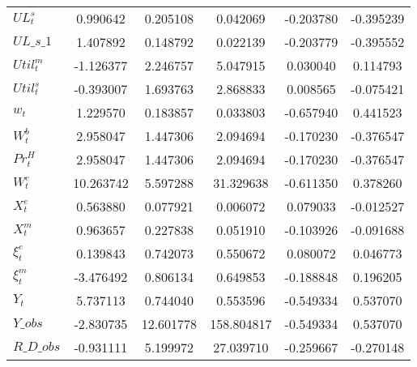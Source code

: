 \begin{center}
\begin{longtable}{lccccc}
$  UL^s_t                   $	 & 	        0.990642	 & 	        0.205108	 & 	        0.042069	 & 	       -0.203780	 & 	       -0.395239 \\ 
$UL\_s\_1                   $	 & 	        1.407892	 & 	        0.148792	 & 	        0.022139	 & 	       -0.203779	 & 	       -0.395552 \\ 
$ Util^m_t                  $	 & 	       -1.126377	 & 	        2.246757	 & 	        5.047915	 & 	        0.030040	 & 	        0.114793 \\ 
$  Util^s_t                 $	 & 	       -0.393007	 & 	        1.693763	 & 	        2.868833	 & 	        0.008565	 & 	       -0.075421 \\ 
$ w_t                       $	 & 	        1.229570	 & 	        0.183857	 & 	        0.033803	 & 	       -0.657940	 & 	        0.441523 \\ 
$ W^b_t                     $	 & 	        2.958047	 & 	        1.447306	 & 	        2.094694	 & 	       -0.170230	 & 	       -0.376547 \\ 
$ Pr^H_t                    $	 & 	        2.958047	 & 	        1.447306	 & 	        2.094694	 & 	       -0.170230	 & 	       -0.376547 \\ 
$ W^e_t                     $	 & 	       10.263742	 & 	        5.597288	 & 	       31.329638	 & 	       -0.611350	 & 	        0.378260 \\ 
$ X^e_t                     $	 & 	        0.563880	 & 	        0.077921	 & 	        0.006072	 & 	        0.079033	 & 	       -0.012527 \\ 
$ X^m_t                     $	 & 	        0.963657	 & 	        0.227838	 & 	        0.051910	 & 	       -0.103926	 & 	       -0.091688 \\ 
$ \xi^e_t                   $	 & 	        0.139843	 & 	        0.742073	 & 	        0.550672	 & 	        0.080072	 & 	        0.046773 \\ 
$  \xi^m_t                  $	 & 	       -3.476492	 & 	        0.806134	 & 	        0.649853	 & 	       -0.188848	 & 	        0.196205 \\ 
$ Y_t                       $	 & 	        5.737113	 & 	        0.744040	 & 	        0.553596	 & 	       -0.549334	 & 	        0.537070 \\ 
$Y\_obs                     $	 & 	       -2.830735	 & 	       12.601778	 & 	      158.804817	 & 	       -0.549334	 & 	        0.537070 \\ 
$R\_D\_obs                  $	 & 	       -0.931111	 & 	        5.199972	 & 	       27.039710	 & 	       -0.259667	 & 	       -0.270148 \\ 

\end{longtable}
\end{center}
